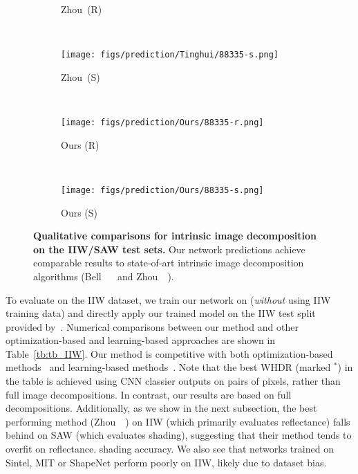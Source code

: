 \documentclass[10pt,twocolumn,letterpaper]{article}
\begin{document}
\begin{figure*}[ptb]
\begin{subfigure}[b]{0.135\textwidth}
	\caption{Zhou~\etal (R)}  \vspace{-0.1em}
    \end{subfigure} \hspace*{-0.8em} 
    ~    
    \begin{subfigure}[b]{0.135\textwidth}
        \texttt{[image: figs/prediction/Tinghui/88335-s.png]}
    \caption{Zhou~\etal (S)}  \vspace{-0.1em}
    \end{subfigure}   \hspace*{-0.8em}
    ~
    \begin{subfigure}[b]{0.135\textwidth}
        \texttt{[image: figs/prediction/Ours/88335-r.png]}
    \caption{Ours (R)}  \vspace{-0.1em}
    \end{subfigure}   \hspace*{-0.8em}
    ~    
    \begin{subfigure}[b]{0.135\textwidth}
        \texttt{[image: figs/prediction/Ours/88335-s.png]}
    \caption{Ours (S)}  \vspace{-0.1em}
    \end{subfigure}  
    
  	\caption{\textbf{Qualitative comparisons for intrinsic image
            decomposition on the IIW/SAW test sets.} Our network
          predictions achieve comparable results to state-of-art
          intrinsic image decomposition algorithms (Bell~\etal
          ~\cite{bell2014intrinsic} and
          Zhou~\etal~\cite{zhou2015learning}).  \label{fig:visual_compare}}
        \vspace{-0.1em}%
\end{figure*}To evaluate on the IIW dataset, we train our network
on \BTShort (\emph{without} using IIW training data) and directly
apply our trained model on the IIW test split provided
by~\cite{narihira2015learning}. Numerical comparisons between our
method and other optimization-based and learning-based approaches are
shown in Table~\ref{tb:tb_IIW}.
Our method is competitive with both optimization-based
methods~\cite{bell2014intrinsic} and learning-based
methods~\cite{zhou2015learning}. Note that the best WHDR (marked
${}^*$) in the table is achieved using CNN classier outputs on pairs
of pixels, rather than full image decompositions. In contrast, our
results are based on full decompositions. Additionally, as we show in
the next subsection, the best performing method
(Zhou~\etal~\cite{zhou2015learning}) on IIW (which primarily evaluates
reflectance) falls behind on SAW (which evaluates shading), suggesting
that their method tends to overfit on reflectance. %
shading accuracy.
We also see that networks trained on Sintel, MIT or ShapeNet perform
poorly on IIW, likely due to dataset bias.
\end{document}
